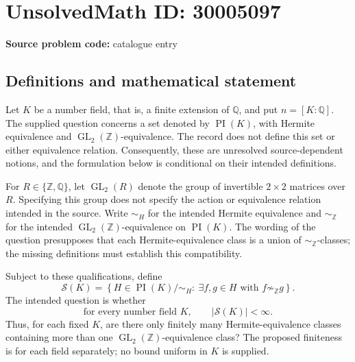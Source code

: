 \documentclass[11pt]{article}
\newcommand{\Z}{\mathbb{Z}}
\newcommand{\Q}{\mathbb{Q}}
\begin{document}
\section*{UnsolvedMath ID: 30005097}
\textbf{Source problem code:} catalogue entry
\subsection{Definitions and mathematical statement}
Let \(K\) be a number field, that is, a finite extension of \(\Q\), and put \(n=[K:\Q]\). The supplied question concerns a set denoted by \(\operatorname{PI}(K)\), with Hermite equivalence and \(\operatorname{GL}_2(\Z)\)-equivalence. The record does not define this set or either equivalence relation. Consequently, these are unresolved source-dependent notions, and the formulation below is conditional on their intended definitions.

For \(R\in\{\Z,\Q\}\), let \(\operatorname{GL}_2(R)\) denote the group of invertible \(2\times2\) matrices over \(R\). Specifying this group does not specify the action or equivalence relation intended in the source. Write \(\sim_H\) for the intended Hermite equivalence and \(\sim_{\Z}\) for the intended \(\operatorname{GL}_2(\Z)\)-equivalence on \(\operatorname{PI}(K)\). The wording of the question presupposes that each Hermite-equivalence class is a union of \(\sim_{\Z}\)-classes; the missing definitions must establish this compatibility.

Subject to these qualifications, define
\[
\mathcal S(K)=\left\{H\in\operatorname{PI}(K)/{\sim_H}:\ \exists f,g\in H\text{ with }f\not\sim_{\Z}g\right\}.
\]
The intended question is whether
\[
\text{for every number field }K,\qquad |\mathcal S(K)|<\infty.
\]
Thus, for each fixed \(K\), are there only finitely many Hermite-equivalence classes containing more than one \(\operatorname{GL}_2(\Z)\)-equivalence class? The proposed finiteness is for each field separately; no bound uniform in \(K\) is supplied.
\end{document}
